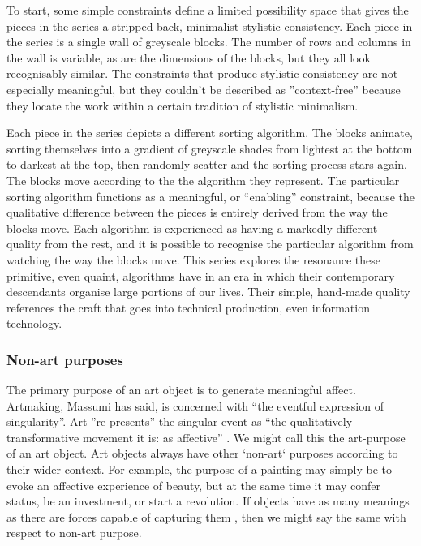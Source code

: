 \documentclass[letterpaper]{article}
\begin{document}
    To start, some simple constraints define a limited possibility space that gives the pieces in the series a stripped back, minimalist stylistic consistency. Each piece in the series is a single wall of greyscale blocks. The number of rows and columns in the wall is variable, as are the dimensions of the blocks, but they all look recognisably similar. The constraints that produce stylistic consistency are not especially meaningful, but they couldn't be described as ”context-free” because they locate the work within a certain tradition of stylistic minimalism.
    
    Each piece in the series depicts a different sorting algorithm. The blocks animate, sorting themselves into a gradient of greyscale shades from lightest at the bottom to darkest at the top, then randomly scatter and the sorting process stars again. The blocks move according to the the algorithm they represent. The particular sorting algorithm functions as a meaningful, or “enabling” constraint, because the qualitative difference between the pieces is entirely derived from the way the blocks move. Each algorithm is experienced as having a markedly different quality from the rest, and it is possible to recognise the particular algorithm from watching the way the blocks move. This series explores the resonance these primitive, even quaint, algorithms have in an era in which their contemporary descendants organise large portions of our lives. Their simple, hand-made quality references the craft that goes into technical production, even information technology.

    \subsubsection{Non-art purposes}

    The primary purpose of an art object is to generate meaningful affect. Artmaking, Massumi has said, is concerned with “the eventful expression of singularity”. Art ”re-presents” the singular event as “the qualitatively transformative movement it is: as affective” \citep[p.252]{MassumiPrblsFrThVrtl2002}. We might call this the art-purpose of an art object. Art objects always have other ‘non-art‘ purposes according to their wider context. For example, the purpose of a painting may simply be to evoke an affective experience of beauty, but at the same time it may confer status, be an investment, or start a revolution. If objects have as many meanings as there are forces capable of capturing them \citep[p.4]{DeleuzeNtschAndPhlsphy2006}, then we might say the same with respect to non-art purpose.
\end{document}

